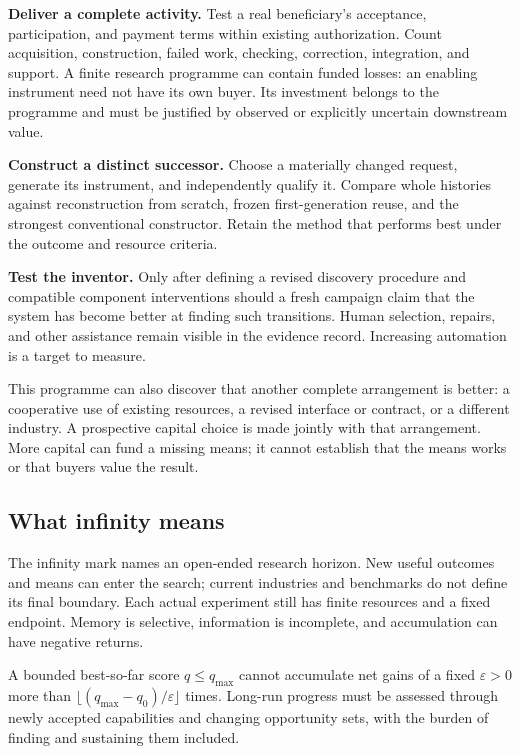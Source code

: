 \documentclass[10pt,a4paper]{article}
\begin{document}
\textbf{Deliver a complete activity.} Test a real beneficiary's acceptance, participation, and payment terms within existing authorization. Count acquisition, construction, failed work, checking, correction, integration, and support. A finite research programme can contain funded losses: an enabling instrument need not have its own buyer. Its investment belongs to the programme and must be justified by observed or explicitly uncertain downstream value.

\textbf{Construct a distinct successor.} Choose a materially changed request, generate its instrument, and independently qualify it. Compare whole histories against reconstruction from scratch, frozen first-generation reuse, and the strongest conventional constructor. Retain the method that performs best under the outcome and resource criteria.

\textbf{Test the inventor.} Only after defining a revised discovery procedure and compatible component interventions should a fresh campaign claim that the system has become better at finding such transitions. Human selection, repairs, and other assistance remain visible in the evidence record. Increasing automation is a target to measure.

This programme can also discover that another complete arrangement is better: a cooperative use of existing resources, a revised interface or contract, or a different industry. A prospective capital choice is made jointly with that arrangement. More capital can fund a missing means; it cannot establish that the means works or that buyers value the result.

\subsection{What infinity means}

The infinity mark names an open-ended research horizon. New useful outcomes and means can enter the search; current industries and benchmarks do not define its final boundary. Each actual experiment still has finite resources and a fixed endpoint. Memory is selective, information is incomplete, and accumulation can have negative returns.

A bounded best-so-far score $q\leq q_{\max}$ cannot accumulate net gains of a fixed $\varepsilon>0$ more than $\lfloor(q_{\max}-q_0)/\varepsilon\rfloor$ times. Long-run progress must be assessed through newly accepted capabilities and changing opportunity sets, with the burden of finding and sustaining them included.
\end{document}

